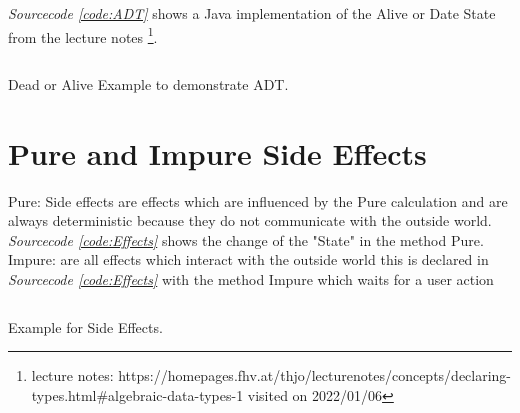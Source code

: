 \documentclass[a4paper,12pt,twoside]{scrreprt}
\begin{document}
\emph{Sourcecode \ref{code:ADT}} shows a Java implementation of the Alive or Date State from the lecture notes \footnote{ lecture notes: https://homepages.fhv.at/thjo/lecturenotes/concepts/declaring-types.html\#algebraic-data-types-1 visited on 2022/01/06}.
\begin{listing}[ht]
    \inputminted[fontsize=\footnotesize,linenos]{java}{./code/ADT.java}
    \caption[Example for a \ac{ADT}]{Dead or Alive Example to demonstrate \ac{ADT}.}
    \label{code:ADT}
\end{listing}
\clearpage


\section{Pure and Impure Side Effects}
Pure: Side effects are effects which are influenced by the Pure calculation and are always deterministic because they do not communicate with the outside world. \emph{Sourcecode \ref{code:Effects}} shows the change of the "State" in the method Pure.
\newline
Impure: are all effects which interact with the outside world this is declared in \emph{Sourcecode \ref{code:Effects}} with the method Impure which waits for a user action
\begin{listing}[ht]
    \inputminted[fontsize=\footnotesize,linenos]{java}{./code/SideEffects.java}
    \caption[Example for Side Effects]{Example for Side Effects.}
    \label{code:Effects}
\end{listing}
\clearpage
\clearpage
{}
{}
\printbibliography
\end{document}
